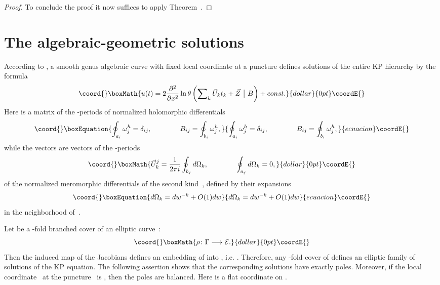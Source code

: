 \documentclass[a4paper,11pt]{article}
\providecommand{\p}{\partial}
\providecommand{\cE}{{\cal E}}
\providecommand{\vU}{\Vec{U}}
\providecommand{\vZ}{\Vec{Z}}
\theoremstyle{plain}
\theoremstyle{remark}
\begin{document}
\begin{proof}
To conclude the proof it now suffices to apply Theorem~\coordHE{}.
\end{proof}

\section{The algebraic-geometric solutions}

According to \cite{kr}, a smooth genus \coordHE{} algebraic curve
\myHighlight{$\Gamma$}\coordHE{} with fixed local coordinate \coordHE{} at a puncture \coordHE{} defines solutions
of the entire KP hierarchy by the formula
$$\coord{}\boxMath{
u(t)=2\frac{\p^2}{\p x^2} \ln \theta
\left(\biggl. \sum\nolimits_k \vU_k t_k + \vZ\ \bigr|\ B\right)+const .
}{dollar}{0pt}\coordE{}$$
Here \coordHE{} is a matrix of the \coordHE{}-periods of normalized holomorphic
differentials \coordHE{}
\begin{equation}\coord{}\boxEquation{\label{hd}
\oint_{a_i}\omega^h_j=\delta_{ij},\qquad\qquad
B_{ij}=\oint_{b_i}\omega^h_j,
}{\oint_{a_i}\omega^h_j=\delta_{ij},\qquad\qquad
B_{ij}=\oint_{b_i}\omega^h_j,
}{ecuacion}\coordE{}\end{equation}
while the vectors \myHighlight{$\vU_k=(\vU_k^j)$}\coordHE{} are vectors of the \coordHE{}-periods
$$\coord{}\boxMath{
\vU_k^{j}=\frac{1}{2\pi i}\oint_{b_j}d\Omega_k,\qquad\qquad
\oint_{a_j}d\Omega_k=0,
}{dollar}{0pt}\coordE{}$$
of the normalized meromorphic differentials of the second kind~\coordHE{},
defined by their expansions
\begin{equation}\coord{}\boxEquation{\label{om}
d\Omega_k=dw^{-k}+O(1)dw
}{d\Omega_k=dw^{-k}+O(1)dw
}{ecuacion}\coordE{}\end{equation}
in the neighborhood of~\coordHE{}.

Let \myHighlight{$\Gamma$}\coordHE{} be a \coordHE{}-fold branched cover of an elliptic curve~\myHighlight{$\cE$}\coordHE{}:
$$\coord{}\boxMath{
\rho\colon\Gamma\longrightarrow\cE .
}{dollar}{0pt}\coordE{}$$
Then the induced map of the Jacobians defines an embedding of
\coordHE{} into \coordHE{}, i.e. \myHighlight{$\rho^*\cE\subset J(\Gamma)$}\coordHE{}.
Therefore, any \coordHE{}-fold cover of \coordHE{} defines an elliptic family
of solutions of the KP equation. The following assertion shows that
the corresponding solutions have exactly \coordHE{} poles.
Moreover, if the local coordinate~\coordHE{} at
the puncture~\coordHE{} is \myHighlight{$\rho^*(\lambda)$}\coordHE{}, then the poles are balanced.
Here \myHighlight{$\lambda$}\coordHE{} is a flat coordinate on \myHighlight{$\cE$}\coordHE{}.
\end{document}
